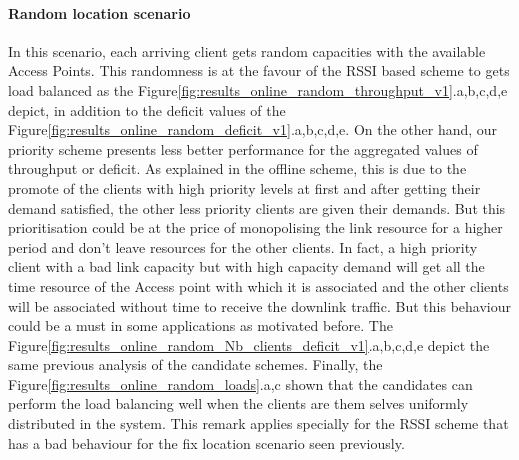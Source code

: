 \documentclass[journal,transmag]{IEEEtran}
\begin{document}
\paragraph{Random location scenario}
In this scenario, each arriving client gets random capacities with the available Access Points. This randomness is at the favour of the RSSI based scheme to gets load balanced as the Figure\ref{fig:results_online_random_throughput_v1}.a,b,c,d,e depict, in addition to the deficit values of the Figure\ref{fig:results_online_random_deficit_v1}.a,b,c,d,e. On the other hand, our priority scheme presents less better performance for the aggregated values of throughput or deficit. As explained in the offline scheme, this is due to the promote of the clients with high priority levels at first and after getting their demand satisfied, the other less priority clients are given their demands. But this prioritisation could be at the price of monopolising the link resource for a higher period and don't leave resources for the other clients. In fact, a high priority client with a bad link capacity but with high capacity demand will get all the time resource of the Access point with which it is associated and the other clients will be associated without time to receive the downlink traffic. But this behaviour could be a must in some applications as motivated before. The Figure\ref{fig:results_online_random_Nb_clients_deficit_v1}.a,b,c,d,e depict the same previous analysis of the candidate schemes. Finally, the Figure\ref{fig:results_online_random_loads}.a,c shown that the candidates can perform the load balancing well when the clients are them selves uniformly distributed in the system. This remark applies specially for the RSSI scheme that has a bad behaviour for the fix location scenario seen previously.   
\end{document}
